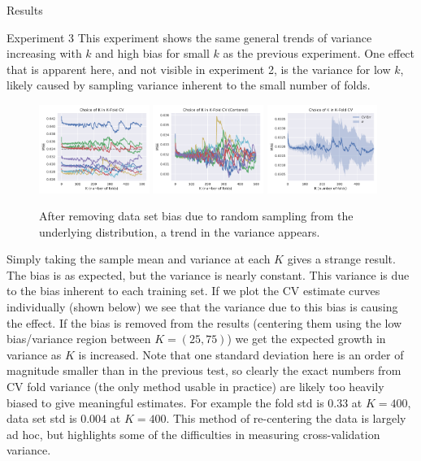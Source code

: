 \documentclass[onecolumn,abstract,paper=letter]{scrartcl}
\begin{document}
\begin{section}{Results}
\begin{subsection}{Experiment 3}
This experiment shows the same general trends of variance increasing with $k$ and high bias for small $k$ as the previous experiment. 
One effect that is apparent here, and not visible in experiment 2, is the variance for low $k$, likely caused by sampling variance inherent to the small number of folds.
\begin{figure}[ht]
    \centering
    \includegraphics[width=0.32\textwidth]{plots/kfold-alt-all-5x4.pdf}
    \includegraphics[width=0.32\textwidth]{plots/kfold-alt-center-5x4.pdf}
    \includegraphics[width=0.32\textwidth]{plots/kfold-alt-5x4.pdf}
    \caption{After removing data set bias due to random sampling from the underlying distribution, a trend in the variance appears.}
    \label{fig:kfold_cv_alt}
\end{figure}

Simply taking the sample mean and variance at each $K$ gives a strange result.
The bias is as expected, but the variance is nearly constant.
This variance is due to the bias inherent to each training set.
If we plot the CV estimate curves individually (shown below) we see that the variance due to this bias is causing the effect.
If the bias is removed from the results (centering them using the low bias/variance region between $K=(25,75)$) we get the expected growth in variance as $K$ is increased. 
Note that one standard deviation here is an order of magnitude smaller than in the previous test, so clearly the exact numbers from CV fold variance (the only method usable in practice) are likely too heavily biased to give meaningful estimates. For example the fold std is 0.33 at $K=400$, data set std is 0.004 at $K=400$.
This method of re-centering the data is largely ad hoc, but highlights some of the difficulties in measuring cross-validation variance. 
\end{subsection}


\end{section}
\end{document}
